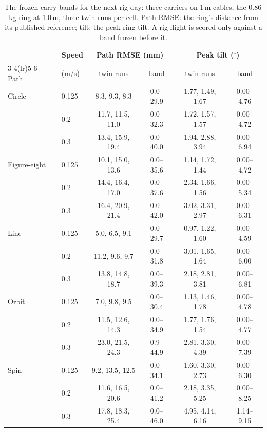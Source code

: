 \begin{table}[htbp]
\centering
\footnotesize
\caption[The frozen carry bands, 1\,m cables]{The frozen carry bands for the next rig day: three carriers on 1\,m
cables, the 0.86\,kg ring at 1.0\,m, three twin runs per cell. Path RMSE: the ring's distance from its published
reference; tilt: the peak ring tilt. A rig flight is scored only against a band frozen before it.}
\label{tab:bands1m}
\begin{tabular}{llcccc}
\toprule
 & Speed & \multicolumn{2}{c}{Path RMSE (mm)} & \multicolumn{2}{c}{Peak tilt ($^\circ$)} \\
\cmidrule(lr){3-4}\cmidrule(lr){5-6}
Path & (m/s) & twin runs & band & twin runs & band \\
\midrule
Circle & 0.125 & 8.3, 9.3, 8.3 & 0.0--29.9 & 1.77, 1.49, 1.67 & 0.00--4.76 \\
 & 0.2 & 11.7, 11.5, 11.0 & 0.0--32.3 & 1.72, 1.57, 1.57 & 0.00--4.72 \\
 & 0.3 & 13.4, 15.9, 19.4 & 0.0--40.0 & 1.94, 2.88, 3.94 & 0.00--6.94 \\
Figure-eight & 0.125 & 10.1, 15.0, 13.6 & 0.0--35.6 & 1.14, 1.72, 1.44 & 0.00--4.72 \\
 & 0.2 & 14.4, 16.4, 17.0 & 0.0--37.6 & 2.34, 1.66, 1.56 & 0.00--5.34 \\
 & 0.3 & 16.4, 20.9, 21.4 & 0.0--42.0 & 3.02, 3.31, 2.97 & 0.00--6.31 \\
Line & 0.125 & 5.0, 6.5, 9.1 & 0.0--29.7 & 0.97, 1.22, 1.60 & 0.00--4.59 \\
 & 0.2 & 11.2, 9.6, 9.7 & 0.0--31.8 & 3.01, 1.65, 1.64 & 0.00--6.00 \\
 & 0.3 & 13.8, 14.8, 18.7 & 0.0--39.3 & 2.18, 2.81, 3.81 & 0.00--6.81 \\
Orbit & 0.125 & 7.0, 9.8, 9.5 & 0.0--30.4 & 1.13, 1.46, 1.78 & 0.00--4.78 \\
 & 0.2 & 11.5, 12.6, 14.3 & 0.0--34.9 & 1.77, 1.76, 1.54 & 0.00--4.77 \\
 & 0.3 & 23.0, 21.5, 24.3 & 0.9--44.9 & 2.81, 3.30, 4.39 & 0.00--7.39 \\
Spin & 0.125 & 9.2, 13.5, 12.5 & 0.0--34.1 & 1.60, 3.30, 2.73 & 0.00--6.30 \\
 & 0.2 & 11.6, 16.5, 20.6 & 0.0--41.2 & 2.18, 3.35, 5.25 & 0.00--8.25 \\
 & 0.3 & 17.8, 18.3, 25.4 & 0.0--46.0 & 4.95, 4.14, 6.16 & 1.14--9.15 \\
\bottomrule
\end{tabular}
\end{table}

